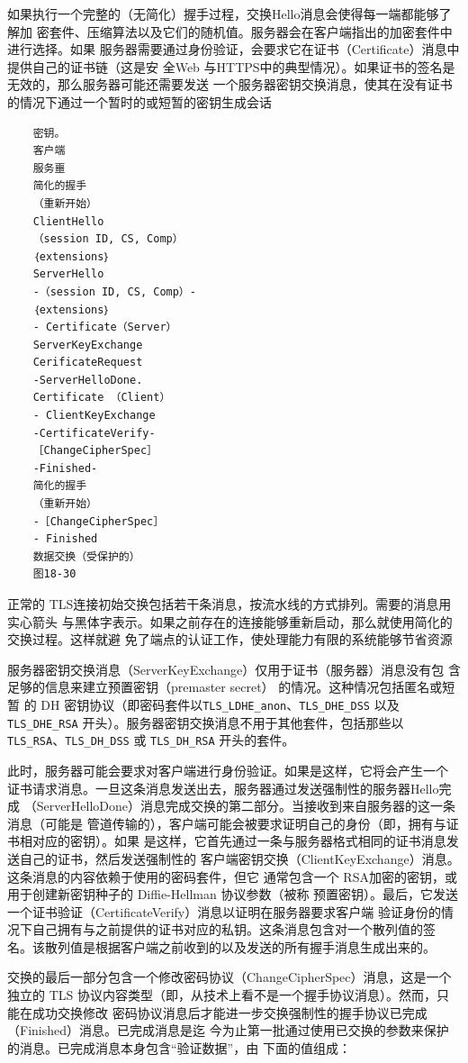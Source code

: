 如果执行一个完整的（无简化）握手过程，交换Hello消息会使得每一端都能够了解加
密套件、压缩算法以及它们的随机值。服务器会在客户端指出的加密套件中进行选择。如果
服务器需要通过身份验证，会要求它在证书（Certificate）消息中提供自己的证书链（这是安
全Web 与HTTPS中的典型情况）。如果证书的签名是无效的，那么服务器可能还需要发送
一个服务器密钥交换消息，使其在没有证书的情况下通过一个暂时的或短暂的密钥生成会话
\begin{verbatim}
    密钥。
    客户端
    服务噩
    简化的握手
    （重新开始）
    ClientHello
    （session ID, CS, Comp）
    ｛extensions｝
    ServerHello
    -（session ID, CS, Comp）-
    ｛extensions｝
    - Certificate（Server）
    ServerKeyExchange
    CerificateRequest
    -ServerHelloDone.
    Certificate （Client）
    - ClientKeyExchange
    -CertificateVerify-
    ［ChangeCipherSpec］
    -Finished-
    简化的握手
    （重新开始）
    -［ChangeCipherSpec］
    - Finished
    数据交换（受保护的）
    图18-30
\end{verbatim}
正常的 TLS连接初始交换包括若干条消息，按流水线的方式排列。需要的消息用实心箭头
与黑体字表示。如果之前存在的连接能够重新启动，那么就使用简化的交换过程。这样就避
免了端点的认证工作，使处理能力有限的系统能够节省资源
\begin{tcolorbox}
    服务器密钥交换消息（ServerKeyExchange）仅用于证书（服务器）消息没有包
    含足够的信息来建立预置密钥（premaster secret） 的情况。这种情况包括匿名或短暂
    的 DH 密钥协议（即密码套件以\verb|TLS_LDHE_anon|、\verb|TLS_DHE_DSS| 以及 \verb|TLS_DHE_RSA|
    开头）。服务器密钥交换消息不用于其他套件，包括那些以 \verb|TLS_RSA|、\verb|TLS_DH_DSS| 或 \verb|TLS_DH_RSA| 开头的套件。
\end{tcolorbox}
此时，服务器可能会要求对客户端进行身份验证。如果是这样，它将会产生一个
证书请求消息。一旦这条消息发送出去，服务器通过发送强制性的服务器Hello完成
（ServerHelloDone）消息完成交换的第二部分。当接收到来自服务器的这一条消息（可能是
管道传输的），客户端可能会被要求证明自己的身份（即，拥有与证书相对应的密钥）。如果
是这样，它首先通过一条与服务器格式相同的证书消息发送自己的证书，然后发送强制性的
客户端密钥交换（ClientKeyExchange）消息。这条消息的内容依赖于使用的密码套件，但它
通常包含一个 RSA加密的密钥，或用于创建新密钥种子的 Diffie-Hellman 协议参数（被称
预置密钥）。最后，它发送一个证书验证（CertificateVerify）消息以证明在服务器要求客户端
验证身份的情况下自己拥有与之前提供的证书对应的私钥。这条消息包含对一个散列值的签
名。该散列值是根据客户端之前收到的以及发送的所有握手消息生成出来的。

交换的最后一部分包含一个修改密码协议（ChangeCipherSpec）消息，这是一个独立的
TLS 协议内容类型（即，从技术上看不是一个握手协议消息）。然而，只能在成功交换修改
密码协议消息后才能进一步交换强制性的握手协议已完成（Finished）消息。已完成消息是迄
今为止第一批通过使用已交换的参数来保护的消息。已完成消息本身包含“验证数据”，由
下面的值组成：

